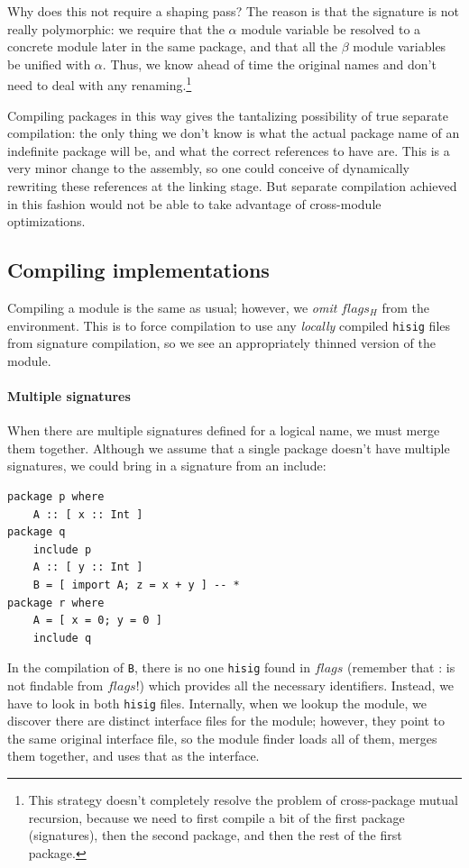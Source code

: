 \documentclass{article}
\begin{document}
Why does this not require a shaping pass? The reason is that the
signature is not really polymorphic: we require that the $\alpha$ module
variable be resolved to a concrete module later in the same package, and
that all the $\beta$ module variables be unified with $\alpha$. Thus, we
know ahead of time the original names and don't need to deal with any
renaming.\footnote{This strategy doesn't completely resolve the problem
of cross-package mutual recursion, because we need to first compile a
bit of the first package (signatures), then the second package, and then
the rest of the first package.}

Compiling packages in this way gives the tantalizing possibility
of true separate compilation: the only thing we don't know is what the actual
package name of an indefinite package will be, and what the correct references
to have are.  This is a very minor change to the assembly, so one could conceive
of dynamically rewriting these references at the linking stage.  But
separate compilation achieved in this fashion would not be able to take
advantage of cross-module optimizations.

\subsection{Compiling implementations}

Compiling a module is the same as usual; however, we \emph{omit}
$flags_H$ from the environment.  This is to force compilation to use any
\emph{locally} compiled \texttt{hisig} files from signature compilation,
so we see an appropriately thinned version of the module.

\paragraph{Multiple signatures}  When there are multiple signatures
defined for a logical name, we must merge them together.  Although we
assume that a single package doesn't have multiple signatures, we could
bring in a signature from an include:

\begin{verbatim}
package p where
    A :: [ x :: Int ]
package q
    include p
    A :: [ y :: Int ]
    B = [ import A; z = x + y ] -- *
package r where
    A = [ x = 0; y = 0 ]
    include q
\end{verbatim}

In the compilation of \texttt{B}, there is no one \texttt{hisig} found
in $flags$ (remember that : is not findable from $flags$!)
which provides all the necessary identifiers.  Instead, we have to look
in both \texttt{hisig} files.  Internally, when we lookup the module, we
discover there are distinct interface files for the module; however,
they point to the same original interface file, so the module finder
loads all of them, merges them together, and uses that as the interface.
\end{document}
